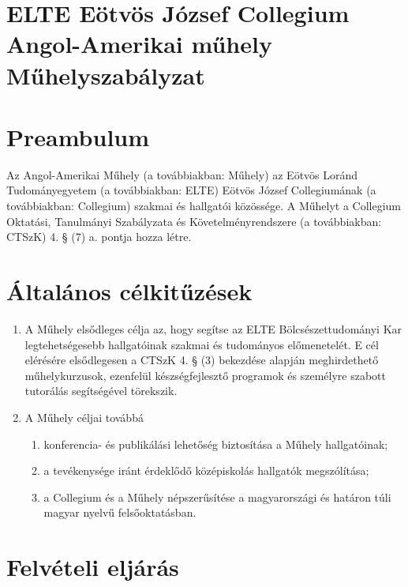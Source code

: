 \documentclass{../styles/rulebook}
\begin{document}
\section*{ELTE Eötvös József Collegium \\ Angol-Amerikai műhely\\ \vspace{0.5em} Műhelyszabályzat} 

\vspace{2em}

\section*{Preambulum}

Az Angol-Amerikai Műhely (a továbbiakban: Műhely) az Eötvös Loránd
Tudományegyetem (a továbbiakban: ELTE) Eötvös József Collegiumának (a
továbbiakban: Collegium) szakmai és hallgatói közössége. A Műhelyt a Collegium
Oktatási, Tanulmányi Szabályzata és Követelményrendszere (a továbbiakban:
CTSzK) 4. § (7) a. pontja hozza létre.

\section{Általános célkitűzések}

\begin{enumerate}
 \item A Műhely elsődleges célja az, hogy segítse az ELTE Bölcsészettudományi Kar
 legtehetségesebb hallgatóinak szakmai és tudományos előmenetelét. E cél elérésére
 elsődlegesen a CTSzK 4. § (3) bekezdése alapján meghirdethető műhelykurzusok,
 ezenfelül készségfejlesztő programok és személyre szabott tutorálás segítségével
 törekszik.
 \item A Műhely céljai továbbá
 \begin{enumerate}
	  \item konferencia- és publikálási lehetőség biztosítása a Műhely hallgatóinak;
	  \item a tevékenysége iránt érdeklődő középiskolás hallgatók megszólítása;
	  \item a Collegium és a Műhely népszerűsítése a magyarországi és határon túli magyar
	  nyelvű felsőoktatásban. 
 \end{enumerate}
\end{enumerate}

\section{Felvételi eljárás}
\end{document}
